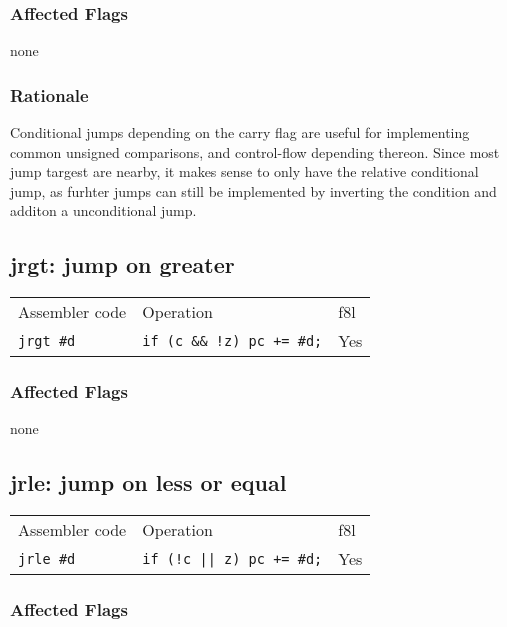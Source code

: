 \documentclass{book}
\begin{document}
\subsubsection*{Affected Flags}

none

\subsubsection*{Rationale}

Conditional jumps depending on the carry flag are useful for implementing common unsigned comparisons, and control-flow depending thereon. Since most jump targest are nearby, it makes sense to only have the relative conditional jump, as furhter jumps can still be implemented by inverting the condition and additon a unconditional jump.


\subsection{jrgt: jump on greater}

\begin{tabular}{l l l}
Assembler code    & Operation                        & f8l \\
\texttt{jrgt \#d} & \texttt{if (c \&\& !z) pc += \#d;} & Yes \\
\end{tabular}

\subsubsection*{Affected Flags}

none

\subsection{jrle: jump on less or equal}

\begin{tabular}{l l l}
Assembler code    & Operation                        & f8l \\
\texttt{jrle \#d} & \texttt{if (!c || z) pc += \#d;} & Yes \\
\end{tabular}

\subsubsection*{Affected Flags}
\end{document}
